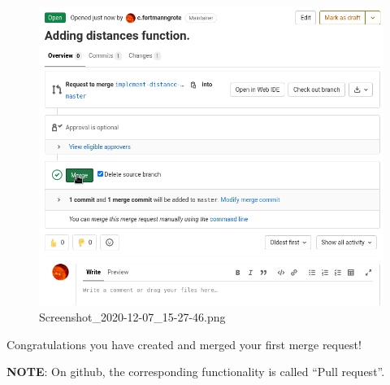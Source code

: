 \documentclass[11pt]{article}
\makeatletter
\newcommand{\boxspacing}{\kern\kvtcb@left@rule\kern\kvtcb@boxsep}
\newcommand{\prompt}[4]{
        \ttfamily\llap{{\color{#2}[#3]:\hspace{3pt}#4}}\vspace{-\baselineskip}
    }
\makeatother
\begin{document}
\begin{figure}
\centering
\includegraphics{static/pull_request_gitlab.png}
\caption{Screenshot\_2020-12-07\_15-27-46.png}
\end{figure}

Congratulations you have created and merged your first merge request!

\textbf{NOTE}: On github, the corresponding functionality is called
``Pull request''.

    \begin{tcolorbox}[breakable, size=fbox, boxrule=1pt, pad at break*=1mm,colback=cellbackground, colframe=cellborder]
\prompt{In}{incolor}{ }{\boxspacing}
\begin{Verbatim}[commandchars=\\\{\}]

\end{Verbatim}
\end{tcolorbox}


    
    
    
\end{document}
